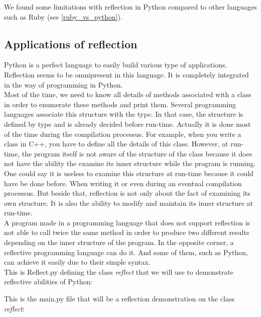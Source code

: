 We found some limitations with reflection in Python compared to other languages such as Ruby (see \autoref{ruby_vs_python}).


\subsection{Applications of reflection}

Python is a perfect language to easily build various type of applications. 
Reflection seems to be omnipresent in this language. 
It is completely integrated in the way of programming in Python.\\

Most of the time, we need to know all details of methods associated with a class in order to enumerate these methods and print them. Several programming languages associate this structure with the type. In that case, the structure is defined by type and is already decided before run-time. Actually it is done most of the time during the compilation processus. For example, when you write a class in C++, you have to define all the details of this class. However, at run-time, the program itself is not aware of the structure of the class because it does not have the ability the examine its inner structure while the program is running.\\
One could say it is useless to examine this structure at run-time because it could have be done before. When writing it or even during an eventual compilation processus. But beside that, reflection is not only about the fact of examining its own structure. It is also the ability to modify and maintain its inner structure at run-time.\\
A program made in a programming language that does not support reflection is not able to call twice the same method in order to produce two different results depending on the inner structure of the program. In the opposite corner, a reflective programming language can do it. And some of them, such as Python, can achieve it easily due to their simple syntax. \cite{assembleforce} \\


This is Reflect.py defining the class \emph{reflect} that we will use to demonstrate reflective abilities of Python:


This is the main.py file that will be a reflection demonstration on the class \emph{reflect}:


